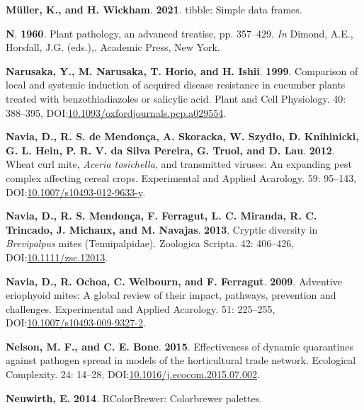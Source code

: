 \documentclass[12pt,final,CPage]{ufthesis}
\newlength{\cslhangindent}
\newenvironment{CSLReferences}[2] %
{%
	\setlength{\parindent}{0pt}
	\ifodd #1 \everypar{\setlength{\hangindent}{\cslhangindent}}\ignorespaces\fi
	\ifnum #2 > 0
	\setlength{\parskip}{#2\baselineskip}
	\fi
}%
{}
\begin{document}
{\begin{CSLReferences}{1}{0}
  \leavevmode{}%
  \textbf{Müller, K., and H. Wickham}. \textbf{2021}. {tibble}: Simple data frames.

  \leavevmode{}%
  \textbf{N}. \textbf{1960}. Plant pathology, an advanced treatise, pp. 357--429. \emph{In} Dimond, A.E., Horsfall, J.G. (eds.),. Academic Press, New York.

  \leavevmode{}%
  \textbf{Narusaka, Y., M. Narusaka, T. Horio, and H. Ishii}. \textbf{1999}. Comparison of local and systemic induction of acquired disease resistance in cucumber plants treated with benzothiadiazoles or salicylic acid. Plant and Cell Physiology. 40: 388--395, DOI:\href{https://doi.org/10.1093/oxfordjournals.pcp.a029554}{10.1093/oxfordjournals.pcp.a029554}.

  \leavevmode{}%
  \textbf{Navia, D., R. S. de Mendonça, A. Skoracka, W. Szydło, D. Knihinicki, G. L. Hein, P. R. V. da Silva Pereira, G. Truol, and D. Lau}. \textbf{2012}. {Wheat curl mite}, {\emph{Aceria tosichella}}, and transmitted viruses: An expanding pest complex affecting cereal crops. Experimental and Applied Acarology. 59: 95--143, DOI:\href{https://doi.org/10.1007/s10493-012-9633-y}{10.1007/s10493-012-9633-y}.

  \leavevmode{}%
  \textbf{Navia, D., R. S. Mendonça, F. Ferragut, L. C. Miranda, R. C. Trincado, J. Michaux, and M. Navajas}. \textbf{2013}. Cryptic diversity in {\emph{Brevipalpus}} mites ({Tenuipalpidae}). Zoologica Scripta. 42: 406--426, DOI:\href{https://doi.org/10.1111/zsc.12013}{10.1111/zsc.12013}.

  \leavevmode{}%
  \textbf{Navia, D., R. Ochoa, C. Welbourn, and F. Ferragut}. \textbf{2009}. Adventive eriophyoid mites: A global review of their impact, pathways, prevention and challenges. Experimental and Applied Acarology. 51: 225--255, DOI:\href{https://doi.org/10.1007/s10493-009-9327-2}{10.1007/s10493-009-9327-2}.

  \leavevmode{}%
  \textbf{Nelson, M. F., and C. E. Bone}. \textbf{2015}. Effectiveness of dynamic quarantines against pathogen spread in models of the horticultural trade network. Ecological Complexity. 24: 14--28, DOI:\href{https://doi.org/10.1016/j.ecocom.2015.07.002}{10.1016/j.ecocom.2015.07.002}.

  \leavevmode{}%
  \textbf{Neuwirth, E.} \textbf{2014}. {RColorBrewer}: Colorbrewer palettes.


\end{CSLReferences}}
\end{document}
